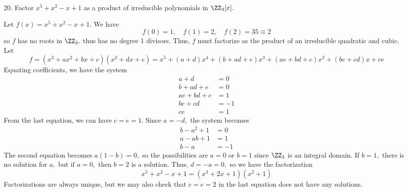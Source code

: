 \documentclass{article}
\begin{document}
\begin{itemize}
	\item[20.] Factor $x^5+x^2-x+1$ as a product of irreducible polynomials in $\ZZ_3[x].$
		\begin{soln}
			Let $f(x)=x^5+x^2-x+1.$ We have \[f(0)=1, \quad f(1)=2, \quad f(2) = 35 \equiv 2\] so $f$ has no roots in $\ZZ_3,$ thus has no degree 1 divisors. Thus, $f$ must factorize as the product of an irreducible quadratic and cubic. Let \[f=(x^3+ax^2+bx+c)(x^2+dx+e) = x^5+(a+d)x^4+(b+ad+e)x^3+(ae+bd+c)x^2+(be+cd)x+ce\] Equating coefficients, we have the system
			\begin{align*}
				a+d &= 0 \\
				b+ad+e &= 0 \\
				ae+bd+c &= 1 \\
				be+cd &= -1 \\
				ce &= 1
			\end{align*}
			From the last equation, we can have $c=e=1.$ Since $a=-d,$ the system becomes
			\begin{align*}
				b-a^2+1 &= 0 \\
				a-ab+1 &= 1 \\
				b-a &= -1 
			\end{align*}
			The second equation becomes $a(1-b)=0,$ so the possibilities are $a=0$ or $b=1$ since $\ZZ_3$ is an integral domain. If $b=1,$ there is no solution for $a,$ but if $a=0,$ then $b=2$ is a solution. Thus, $d=-a=0,$ so we have the factorization \[x^5+x^2-x+1=(x^3+2x+1)(x^2+1)\] Factorizations are always unique, but we may also check that $c=e=2$ in the last equation does not have any solutions.
		\end{soln}


\end{itemize}
\end{document}
